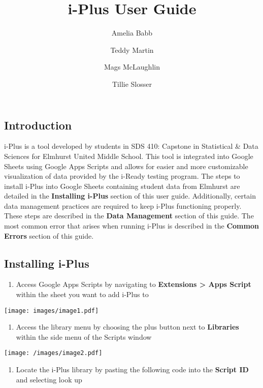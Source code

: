\documentclass[
  letterpaper,
  DIV=11,
  numbers=noendperiod]{scrartcl}
\title{i-Plus User Guide}
\author{Amelia Babb \and Teddy Martin \and Mags McLaughlin \and Tillie
Slosser}
\date{}
\providecommand{\tightlist}{%
  \setlength{\itemsep}{0pt}\setlength{\parskip}{0pt}}\usepackage{longtable,booktabs,array}
\begin{document}
\maketitle


\subsection{Introduction}\label{introduction}

i-Plus is a tool developed by students in SDS 410: Capstone in
Statistical \& Data Sciences for Elmhurst United Middle School. This
tool is integrated into Google Sheets using Google Apps Scripts and
allows for easier and more customizable visualization of data provided
by the i-Ready testing program. The steps to install i-Plus into Google
Sheets containing student data from Elmhurst are detailed in the
\textbf{Installing i-Plus} section of this user guide. Additionally,
certain data management practices are required to keep i-Plus
functioning properly. These steps are described in the \textbf{Data
Management} section of this guide. The most common error that arises
when running i-Plus is described in the \textbf{Common Errors} section
of this guide.

\subsection{Installing i-Plus}\label{installing-i-plus}

\begin{enumerate}
\def\labelenumi{\arabic{enumi}.}
\tightlist
\item
  Access Google Apps Scripts by navigating to \textbf{Extensions
  \textgreater{} Apps Script} within the sheet you want to add i-Plus to
\end{enumerate}

\texttt{[image: images/image1.pdf]}

\begin{enumerate}
\def\labelenumi{\arabic{enumi}.}
\setcounter{enumi}{1}
\tightlist
\item
  Access the library menu by choosing the plus button next to
  \textbf{Libraries} within the side menu of the Scripts window
\end{enumerate}

\texttt{[image: /images/image2.pdf]}

\begin{enumerate}
\def\labelenumi{\arabic{enumi}.}
\setcounter{enumi}{2}
\tightlist
\item
  Locate the i-Plus library by pasting the following code into the
  \textbf{Script ID} and selecting look up
\end{enumerate}
\end{document}

